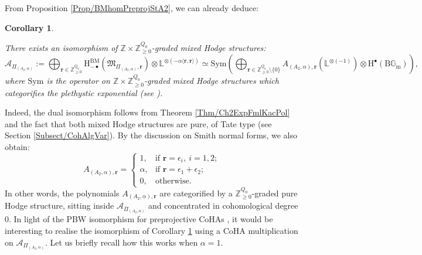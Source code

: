 \documentclass[11pt,english]{article}
\numberwithin{equation}{section}
\numberwithin{figure}{section}
\theoremstyle{definition}
\theoremstyle{plain}
\newtheorem{cor}[df]{Corollary}
\theoremstyle{remark}
\newcommand\rr{\mathbf{r}}
\newcommand\HH{\mathrm{H}}
\newcommand\ZZ{\mathbb{Z}}
\begin{document}
From Proposition \ref{Prop/BMhomPreprojStA2}, we can already deduce:

\begin{cor} \label{Cor/AbstractPBWiso}

There exists an isomorphism of $\ZZ\times\ZZ_{\geq0}^{Q_{0}}$-graded
mixed Hodge structures:\[
\mathcal{A}_{\Pi_{(A_2,\alpha)}}:=
\bigoplus_{\rr\in\ZZ_{\geq0}^{Q_0}}\HH_{-\bullet}^{\mathrm{BM}}\left(\mathfrak{M}_{\Pi_{(A_{2},\alpha)},\rr}\right)\otimes\mathbb{L}^{\otimes(-\alpha\langle\rr,\rr\rangle)}
\simeq
\mathrm{Sym}\left(\bigoplus_{\rr\in\ZZ_{\geq0}^{Q_0}\setminus\{0\}}A_{(A_2,\alpha),\rr}(\mathbb{L}^{\otimes (-1)})\otimes\HH^{\bullet}(\mathrm{B}\mathbb{G}_{\mathrm{m}})\right),
\]where $\mathrm{Sym}$ is the operator on $\ZZ\times\ZZ_{\geq0}^{Q_{0}}$-graded
mixed Hodge structures which categorifies the plethystic exponential
(see \cite[\S 3.2.]{DM20}).

\end{cor}

Indeed, the dual isomorphism follows from Theorem \ref{Thm/Ch2ExpFmlKacPol}
and the fact that both mixed Hodge structures are pure, of Tate type
(see Section \ref{Subsect/CohAlgVar}). By the discussion on Smith
normal forms, we also obtain:\[
A_{(A_2,\alpha),\rr}=
\left\{
\begin{array}{ll}
1, & \text{if }\rr=\epsilon_i,\ i=1,2; \\
\alpha, & \text{if }\rr=\epsilon_1+\epsilon_2; \\
0, & \text{otherwise}.
\end{array}
\right.
\]In other words, the polynomials $A_{(A_{2},\alpha),\rr}$ are categorified
by a $\ZZ_{\geq0}^{Q_{0}}$-graded pure Hodge structure, sitting inside
$\mathcal{A}_{\Pi_{(A_{2},\alpha)}}$ and concentrated in cohomological
degree 0. In light of the PBW isomorphism for preprojective CoHAs
\cite{DHSM22}, it would be interesting to realise the isomorphism
of Corollary \ref{Cor/AbstractPBWiso} using a CoHA multiplication
on $\mathcal{A}_{\Pi_{(A_{2},\alpha)}}$. Let us briefly recall how
this works when $\alpha=1$.
\end{document}
